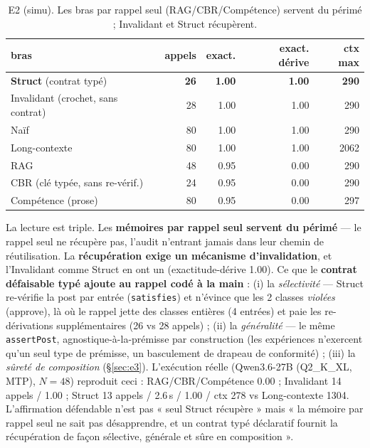 \documentclass[11pt]{article}
\begin{document}
\begin{table}[h]\centering
\begin{tabular}{lrrrr}
\toprule
bras & appels & exact. & \textbf{exact. dérive} & ctx max \\
\midrule
\textbf{Struct} (contrat typé) & \textbf{26} & \textbf{1.00} & \textbf{1.00} & \textbf{290} \\
Invalidant (crochet, sans contrat) & 28 & 1.00 & 1.00 & 290 \\
Naïf & 80 & 1.00 & 1.00 & 290 \\
Long-contexte & 80 & 1.00 & 1.00 & 2062 \\
RAG & 48 & 0.95 & 0.00 & 290 \\
CBR (clé typée, sans re-vérif.) & 24 & 0.95 & 0.00 & 290 \\
Compétence (prose) & 80 & 0.95 & 0.00 & 297 \\
\bottomrule
\end{tabular}
\caption{E2 (simu). Les bras par rappel seul (RAG/CBR/Compétence) servent du périmé ; Invalidant et Struct récupèrent.}
\label{tab:e2}
\end{table}

La lecture est triple. Les \textbf{mémoires par rappel seul servent du périmé} --- le rappel seul ne récupère pas,
l'audit n'entrant jamais dans leur chemin de réutilisation. La \textbf{récupération exige un mécanisme
d'invalidation}, et l'Invalidant comme Struct en ont un (exactitude-dérive 1.00). Ce que le \textbf{contrat
défaisable typé ajoute au rappel codé à la main} : (i) la \emph{sélectivité} --- Struct re-vérifie la post par
entrée (\texttt{satisfies}) et n'évince que les 2 classes \emph{violées} (approve), là où le rappel jette des
classes entières (4 entrées) et paie les re-dérivations supplémentaires (26 vs 28 appels) ; (ii) la
\emph{généralité} --- le même \texttt{assertPost}, agnostique-à-la-prémisse par construction (les expériences
n'exercent qu'un seul type de prémisse, un basculement de drapeau de conformité) ; (iii) la \emph{sûreté de
composition} (§\ref{sec:e3}). L'exécution réelle (Qwen3.6-27B (Q2\_K\_XL, MTP), $N{=}48$) reproduit ceci :
RAG/CBR/Compétence 0.00 ; Invalidant 14 appels / 1.00 ; Struct 13 appels / 2.6\,s / 1.00 / ctx 278 vs
Long-contexte 1304. L'affirmation défendable n'est pas « seul Struct
récupère » mais « la mémoire par rappel seul ne sait pas désapprendre, et un contrat typé déclaratif fournit la
récupération de façon sélective, générale et sûre en composition ».
\end{document}
